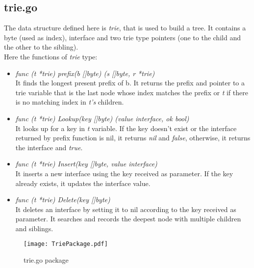 \subsection{trie.go} 

The data structure defined here is \emph{trie}, that is used to build a tree. It contains a byte (used as index), interface and two trie type pointers (one to the child and the other to the sibling).\\
Here the functions of \emph{trie} type:

\begin{itemize}

\item \emph{func (t *trie) prefix(b []byte) (s []byte, r *trie)}\\
It finds the longest present prefix of b. It returns the prefix and pointer to a trie variable that is the last node whose index matches the prefix or \emph{t} if there is no matching index in \emph{t's} children.

\item \emph{func (t *trie) Lookup(key []byte) (value interface{}, ok bool)}\\
It looks up for a key in \emph{t} variable. If the key doesn't exist or the interface returned by prefix function is nil, it returns \emph{nil} and \emph{false}, otherwise, it returns the interface and \emph{true}.

\item \emph{func (t *trie) Insert(key []byte, value interface{})}\\
It inserts a new interface using the key received as parameter. If the key already exists, it updates the interface value.

\item \emph{func (t *trie) Delete(key []byte)}\\
It deletes an interface by setting it to nil according to the key received as parameter. It searches and records the deepest node with multiple children and siblings.

\end{itemize}

\begin{figure}
\centering
\texttt{[image: TriePackage.pdf]}
\caption{trie.go package}
\end{figure}